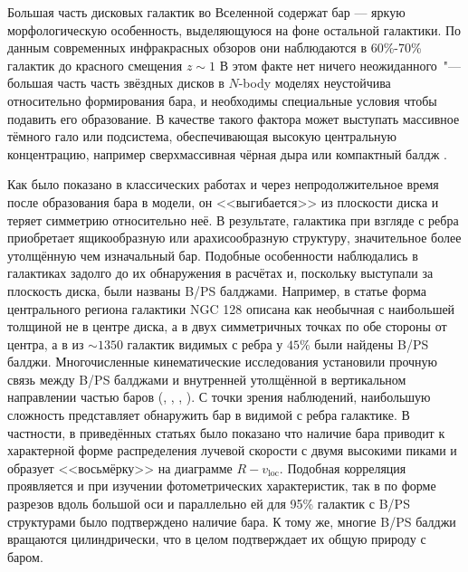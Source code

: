 \documentclass{trlnotes}
\begin{document}
Большая часть дисковых галактик во Вселенной содержат бар --- яркую морфологическую особенность, выделяющуюся на 
фоне остальной галактики. По данным современных инфракрасных 
обзоров они наблюдаются в 60\%-70\% галактик до красного смещения $z\sim 1$ \citep{marinova2007}
В этом факте нет ничего неожиданного~"--- большая часть часть звёздных дисков в $N$-body моделях неустойчива
относительно формирования бара, и необходимы специальные условия чтобы подавить его образование. В качестве такого
фактора может выступать массивное тёмного гало \underdev или подсистема, обеспечивающая высокую
центральную концентрацию, например сверхмассивная чёрная дыра \citep{shen2004} или компактный балдж
\citep{saha2018}.

%
Как было показано в классических работах \cite{combes1981a} и \cite{raha1991} через непродолжительное время после
образования бара в модели, он <<выгибается>> из плоскости диска и теряет симметрию относительно неё. В
результате, галактика при взгляде с ребра приобретает ящикообразную или арахисообразную структуру, значительное
более утолщённую чем изначальный бар. Подобные особенности наблюдались в галактиках задолго до их обнаружения в
расчётах и, поскольку выступали за плоскость диска, были названы B/PS балджами. Например, в статье
\cite{burbidge1959} форма центрального региона галактики NGC 128 описана как необычная с наибольшей толщиной не в
центре диска, а в двух симметричных точках по обе стороны от центра, а в \cite{lutticke2000} из $\sim\!1350$ галактик видимых с ребра у $45\%$ были найдены B/PS балджи.
Многочисленные кинематические исследования установили прочную связь между B/PS балджами и внутренней утолщённой в вертикальном направлении частью баров
(\cite{kuijken1995}, \cite{bureau1999}, \cite{chung2004}, \cite{bureau2006}). С точки зрения наблюдений,
наибольшую сложность представляет обнаружить бар в видимой с ребра галактике. В частности, в приведённых статьях было показано что наличие бара приводит к характерной форме распределения лучевой скорости с двумя высокими пиками и образует <<восьмёрку>> на диаграмме $R - v_{\text{loc}}$. 
Подобная корреляция проявляется и при изучении фотометрических характеристик, так в\cite{lutticke2000a} по форме разрезов вдоль большой оси и параллельно ей для 95\% галактик с B/PS структурами было подтверждено наличие бара. 
К тому же, многие B/PS балджи вращаются цилиндрически, что в целом подтверждает их общую природу с баром. 
 
\end{document}
